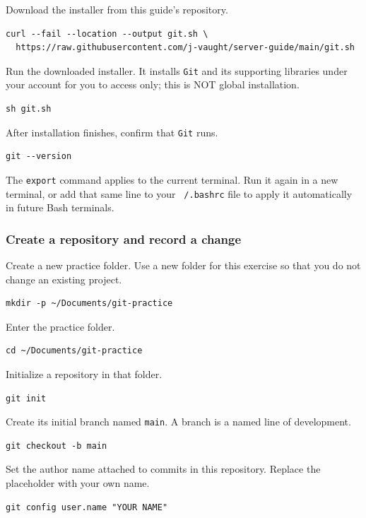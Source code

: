 \documentclass[12pt]{article}
\newcommand{\program}[1]{\begingroup\setlength{\fboxsep}{2pt}%
  \colorbox{ProgramBackground}{\texttt{#1}}\endgroup}
\newcommand{\inlinecode}[1]{\begingroup\setlength{\fboxsep}{2pt}%
  \colorbox{black!5}{\texttt{#1}}\endgroup}
\begin{document}
Download the installer from this guide's repository.
\begin{lstlisting}
curl --fail --location --output git.sh \
  https://raw.githubusercontent.com/j-vaught/server-guide/main/git.sh
\end{lstlisting}

Run the downloaded installer. It installs \program{Git} and its supporting libraries under your account for you to access only; this is NOT global installation.
\begin{lstlisting}
sh git.sh
\end{lstlisting}

After installation finishes, confirm that \program{Git} runs.
\begin{lstlisting}
git --version
\end{lstlisting}

The \inlinecode{export} command applies to the current terminal. Run it again in a new terminal, or add that same line to your \inlinecode{\string~/.bashrc} file to apply it automatically in future Bash terminals.

\subsubsection*{Create a repository and record a change}

Create a new practice folder. Use a new folder for this exercise so that you do not change an existing project.
\begin{lstlisting}
mkdir -p ~/Documents/git-practice
\end{lstlisting}

Enter the practice folder.
\begin{lstlisting}
cd ~/Documents/git-practice
\end{lstlisting}

Initialize a repository in that folder.
\begin{lstlisting}
git init
\end{lstlisting}

Create its initial branch named \inlinecode{main}. A branch is a named line of development.
\begin{lstlisting}
git checkout -b main
\end{lstlisting}

Set the author name attached to commits in this repository. Replace the placeholder with your own name.
\begin{lstlisting}
git config user.name "YOUR NAME"
\end{lstlisting}
\end{document}
